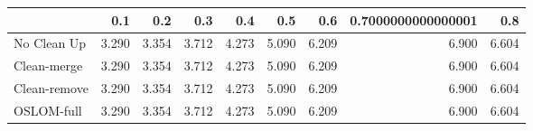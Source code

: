 \begin{tabular}{lrrrrrrrr}
\toprule
{} &   0.1 &   0.2 &   0.3 &   0.4 &   0.5 &   0.6 & 0.7000000000000001 &   0.8 \\
\midrule
No Clean Up  & 3.290 & 3.354 & 3.712 & 4.273 & 5.090 & 6.209 &              6.900 & 6.604 \\
Clean-merge  & 3.290 & 3.354 & 3.712 & 4.273 & 5.090 & 6.209 &              6.900 & 6.604 \\
Clean-remove & 3.290 & 3.354 & 3.712 & 4.273 & 5.090 & 6.209 &              6.900 & 6.604 \\
OSLOM-full   & 3.290 & 3.354 & 3.712 & 4.273 & 5.090 & 6.209 &              6.900 & 6.604 \\
\bottomrule
\end{tabular}
